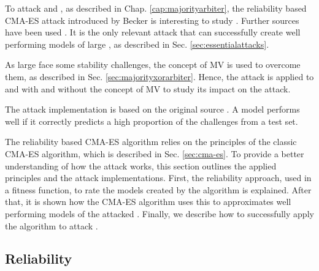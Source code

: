 To attack \mpufs and \mxpufs, as described in Chap. \ref{cap:majorityarbiter}, the reliability based \ac{CMA-ES} attack introduced by Becker is interesting to study \cite{Becker2015ThePUFs}.
Further sources have been used \cite{Becker2015ThePUFs,2017CMA-ES, Hansen2011TheTutorial, Hansen2006TheReview}. %
It is the only relevant attack that can successfully create well performing models of large \xpufs, as described in Sec. \ref{sec:essentialattacks}.

As large \xpufs face some stability challenges, the concept of \ac{MV} is used to overcome them, as described in Sec. \ref{sec:majorityxorarbiter}.
Hence, the attack is applied to \apufs and \xpufs with and without the concept of \ac{MV} to study its impact on the attack. %

The attack implementation is based on the original source \cite{Becker2015ThePUFs}.
A model performs well if it correctly predicts a high proportion of the challenges from a test set.

The reliability based \ac{CMA-ES} algorithm relies on the principles of the classic \ac{CMA-ES} algorithm, which is described in Sec. \ref{sec:cma-es}.
To provide a better understanding of how the attack works, this section outlines the applied principles and the attack implementations. %
First, the reliability approach, used in a fitness function, to rate the models created by the algorithm is explained.
After that, it is shown how the \ac{CMA-ES} algorithm uses this to approximates well performing models of the attacked \apuf.
Finally, we describe how to successfully apply the algorithm to attack \xpufs.


\subsection{Reliability}
\label{sec:reliability}

